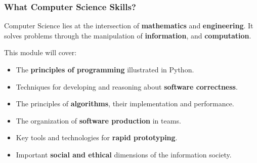 \documentclass{beamer} %
\newcommand\emc[1]{\textcolor{midred}{\textbf{#1}}}
\begin{document}
\begin{frame}
\frametitle{What Computer Science Skills?} 

Computer Science lies at the intersection of \emc{mathematics} and \emc{engineering}. It solves problems through the manipulation of \emc{information}, and \emc{computation}.

\vspace{3mm}
This module will cover:
\begin{itemize}
	\item The \emc{principles of programming} illustrated in Python.
	\item Techniques for developing and reasoning about \emc{software correctness}.
	\item The principles of \emc{algorithms}, their implementation and performance.
	\item The organization of \emc{software production} in teams.
	\item Key tools and technologies for \emc{rapid prototyping}.
	\item Important \emc{social and ethical} dimensions of the information society.
\end{itemize}

\end{frame}
\end{document}
